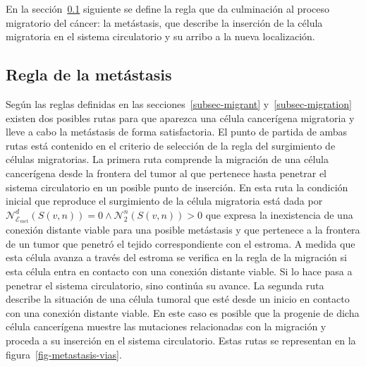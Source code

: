 En la secci\'on~\ref{subsec-metastasis} siguiente se define la regla que da culminaci\'on al proceso migratorio del c\'ancer: la met\'astasis, que describe la inserci\'on de la c\'elula migratoria en el sistema circulatorio y su arribo a la nueva localizaci\'on.

\subsection{Regla de la met\'astasis}
\label{subsec-metastasis}
Seg\'un las reglas definidas en las secciones~\ref{subsec-migrant} y~\ref{subsec-migration} existen dos posibles rutas para que aparezca una c\'elula cancer\'igena migratoria y lleve a cabo la met\'astasis de forma satisfactoria. El punto de partida de ambas rutas est\'a contenido en el criterio de selecci\'on de la regla del surgimiento de c\'elulas migratorias. La primera ruta comprende la migraci\'on de una c\'elula cancer\'igena desde la frontera del tumor al que pertenece hasta penetrar el sistema circulatorio en un posible punto de inserci\'on. En esta ruta la condici\'on inicial que reproduce el surgimiento de la c\'elula migratoria est\'a dada por $\mathcal{N}_{\mathcal{E}_{met}}^d(S(v,n))=0 \wedge \mathcal{N}_2^n(S(v,n))>0$ que expresa la inexistencia de una conexi\'on distante viable para una posible met\'astasis y que pertenece a la frontera de un tumor que penetr\'o el tejido correspondiente con el estroma. A medida que esta c\'elula avanza a trav\'es del estroma se verifica en la regla de la migraci\'on si esta c\'elula entra en contacto con una conexi\'on distante viable. Si lo hace pasa a penetrar el sistema circulatorio, sino contin\'ua su avance. La segunda ruta describe la situaci\'on de una c\'elula tumoral que est\'e desde un inicio en contacto con una conexi\'on distante viable. En este caso es posible que la progenie de dicha c\'elula cancer\'igena muestre las mutaciones relacionadas con la migraci\'on y proceda a su inserci\'on en el sistema circulatorio. Estas rutas se representan en la figura~\ref{fig-metastasis-vias}.

